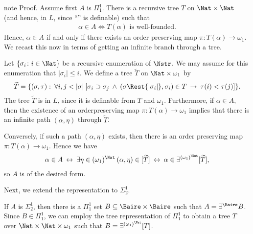 \documentclass[letterpaper,10pt,english]{jupyterBook}
\begin{document}
\begin{sphinxadmonition}{note}
\sphinxAtStartPar
Proof. Assume first \(A\) is \(\Pi^1_1\). There is a recursive tree \(T\) on \(\Nat \times \Nat\) (and hence, in \(L\), since “” is definable) such that
\begin{equation*}
\begin{split}
    \alpha \in A \iff T(\alpha) \text{ is well-founded}.
\end{split}
\end{equation*}
\sphinxAtStartPar
Hence, \(\alpha \in A\) if and only if there exists an order preserving map \(\pi: T(\alpha) \to \omega_1\). We recast this now in terms of getting an infinite branch through a tree.

\sphinxAtStartPar
Let \(\{\sigma_i \colon i \in \Nat\}\) be a recursive enumeration of \(\Nstr\). We may assume for this enumeration that \(|\sigma_i| \leq i\). We define a tree \(\widetilde{T}\) on \(\Nat \times \omega_1\) by
\begin{equation*}
\begin{split}
    \widetilde{T} = \{ (\sigma,\tau) : \: \forall i,j < |\sigma| \: [\sigma_i \supset \sigma_j \: \wedge \: (\sigma\Rest{|\sigma_i|}, \sigma_i) \in T \: \to \: \tau(i) < \tau(j)] \}.
\end{split}
\end{equation*}
\sphinxAtStartPar
The tree \(\widetilde{T}\) is in \(L\), since it is definable from \(T\) and \(\omega_1\). Furthermore, if \(\alpha \in A\), then the existence of an order\sphinxhyphen{}preserving map \(\pi: T(\alpha) \to \omega_1\) implies that there is an infinite path \((\alpha,\eta)\) through \(\widetilde{T}\).

\sphinxAtStartPar
Conversely, if such a path \((\alpha,\eta)\) exists, then there is an order preserving map \(\pi: T(\alpha) \to \omega_1\). Hence we have
\begin{equation*}
\begin{split}
    \alpha \in A \: \leftrightarrow \: \exists \eta \in (\omega_1)^{\Nat} \: (\alpha,\eta) \in [\widetilde{T}] \: \leftrightarrow \: \alpha \in \exists^{(\omega_1)^\Nat}[\widetilde{T}],
\end{split}
\end{equation*}
\sphinxAtStartPar
so \(A\) is of the desired form.

\sphinxAtStartPar
Next, we extend the representation to \(\Sigma^1_2\).

\sphinxAtStartPar
If \(A\) is \(\Sigma^1_2\), then there is a \(\Pi^1_1\) set \(B \subseteq \Baire\times\Baire\)  such that \(A = \exists^{\Baire} B\). Since \(B \in \Pi^1_1\), we can employ the tree representation of \(\Pi^1_1\) to obtain a tree \(T\) over \(\Nat \times \Nat \times \omega_1\) such that \(B = \exists^{(\omega_1)^\Nat} [T]\).


\end{sphinxadmonition}
\end{document}
